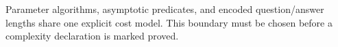 
Parameter algorithms, asymptotic predicates, and encoded question/answer
lengths share one explicit cost model. This boundary must be chosen before a
complexity declaration is marked proved.


